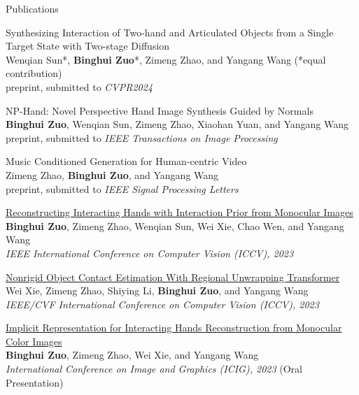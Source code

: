 \documentclass{template_2311} %
\def\myname{\textbf{Binghui Zuo}}
\begin{document}
\begin{rSection}{Publications}
\begin{enumerate}[label={[}\arabic*{]}, ref={\arabic*}]
\item {Synthesizing Interaction of Two-hand and Articulated Objects from a Single  Target State with Two-stage Diffusion}\\
Wenqian Sun*, \myname*, Zimeng Zhao, and Yangang Wang  (*equal contribution)\\
preprint, submitted to \emph{CVPR2024} 

\item {NP-Hand: Novel Perspective Hand Image Synthesis Guided  by Normals} \\
\myname, Wenqian Sun, Zimeng Zhao, Xiaohan Yuan, and Yangang Wang \\
preprint, submitted to \emph{IEEE Transactions on Image Processing}

\item {Music Conditioned Generation for Human-centric Video} \\
Zimeng Zhao, \myname, and Yangang Wang \\
preprint, submitted to \emph{IEEE Signal Processing Letters}

\item \href{https://openaccess.thecvf.com/content/ICCV2023/papers/Zuo_Reconstructing_Interacting_Hands_with_Interaction_Prior_from_Monocular_Images_ICCV_2023_paper.pdf} {Reconstructing Interacting Hands with Interaction Prior from Monocular Images}\\
\myname, Zimeng Zhao, Wenqian Sun, Wei Xie, Chao Wen, and Yangang Wang \\
\emph{IEEE International Conference on Computer Vision (ICCV), 2023}

\item \href{https://openaccess.thecvf.com/content/ICCV2023/papers/Xie_Nonrigid_Object_Contact_Estimation_With_Regional_Unwrapping_Transformer_ICCV_2023_paper.pdf} {Nonrigid Object Contact Estimation With Regional Unwrapping Transformer} \\
Wei Xie, Zimeng Zhao, Shiying Li, \myname, and Yangang Wang \\
\emph{IEEE/CVF International Conference on Computer Vision (ICCV), 2023}

\item \href{https://link.springer.com/chapter/10.1007/978-3-031-46305-1_2} {Implicit Representation for Interacting Hands Reconstruction from Monocular Color Images} \\
\myname, Zimeng Zhao, Wei Xie, and Yangang Wang \\
\emph{International Conference on Image and Graphics (ICIG), 2023} \textcolor[rgb]{1,0,0}{(Oral Presentation)}


\end{enumerate}
\end{rSection}
\end{document}
